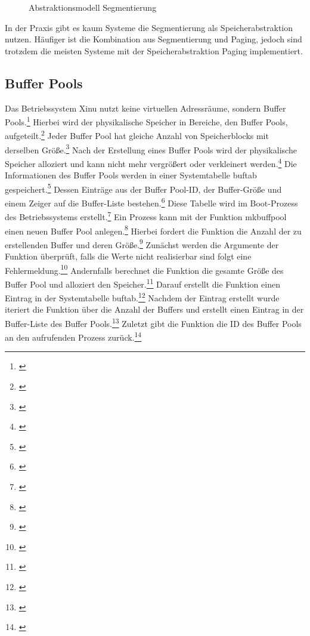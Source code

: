 \begin{figure}[htb]
	\centering
	\caption{Abstraktionsmodell Segmentierung}
\end{figure}

In der Praxis gibt es kaum Systeme die Segmentierung als Speicherabstraktion nutzen. Häufiger ist die Kombination aus Segmentierung und Paging, jedoch sind trotzdem die meisten Systeme mit der Speicherabstraktion Paging implementiert.

\subsection{Buffer Pools}
\label{subsec:BufferPools}
Das Betriebssystem Xinu nutzt keine virtuellen Adressräume, sondern Buffer Pools.\footnote{\cite[S.~176]{Comer.2015}} Hierbei wird der physikalische Speicher in Bereiche, den Buffer Pools, aufgeteilt.\footnote{\cite[S.~176]{Comer.2015}} Jeder Buffer Pool hat gleiche Anzahl von Speicherblocks mit derselben Größe.\footnote{\cite[S.~176]{Comer.2015}} Nach der Erstellung eines Buffer Pools wird der physikalische Speicher alloziert und kann nicht mehr vergrößert oder verkleinert werden.\footnote{\cite[S.~177]{Comer.2015}} Die Informationen des Buffer Pools werden in einer Systemtabelle buftab gespeichert.\footnote{\cite[S.~177]{Comer.2015}} Dessen Einträge aus der Buffer Pool-ID, der Buffer-Größe und einem Zeiger auf die Buffer-Liste bestehen.\footnote{\cite[S.~177]{Comer.2015}}  Diese Tabelle wird im Boot-Prozess des Betriebssystems erstellt.\footnote{\cite[S.~183]{Comer.2015}}
Ein Prozess kann mit der Funktion mkbuffpool einen neuen Buffer Pool anlegen.\footnote{\cite[S.~181]{Comer.2015}} Hierbei fordert die Funktion die Anzahl der zu erstellenden Buffer und deren Größe.\footnote{\cite[S.~181]{Comer.2015}} Zunächst werden die Argumente der Funktion überprüft, falls die Werte nicht realisierbar sind folgt eine Fehlermeldung.\footnote{\cite[S.~181]{Comer.2015}} Andernfalls berechnet die Funktion die gesamte Größe des Buffer Pool und alloziert den Speicher.\footnote{\cite[S.~181]{Comer.2015}} Darauf erstellt die Funktion einen Eintrag in der Systemtabelle buftab.\footnote{\cite[S.~181]{Comer.2015}} Nachdem der Eintrag erstellt wurde iteriert die Funktion über die Anzahl der Buffers und erstellt einen Eintrag in der Buffer-Liste des Buffer Pools.\footnote{\cite[S.~181]{Comer.2015}} Zuletzt gibt die Funktion die ID des Buffer Pools an den aufrufenden Prozess zurück.\footnote{\cite[S.~181]{Comer.2015}}

